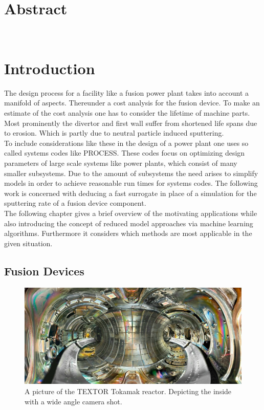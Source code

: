\chapter*{Abstract}
 ~\\
\chapter{Introduction}
	The design process for a facility like a fusion power plant takes into account a manifold of aspects. Thereunder a cost analysis for the fusion device. To make an estimate of the cost analysis one has to consider the lifetime of machine parts. Most prominently the divertor and first wall suffer from shortened life spans due to erosion. Which is partly due to neutral particle induced sputtering.\\
	To include considerations like these in the design of a power plant one uses so called systems codes like PROCESS\cite{process}. These codes focus on optimizing design parameters of large scale systems like power plants, which consist of many smaller subsystems. Due to the amount of subsystems the need arises to simplify models in order to achieve reasonable run times for systems codes. The following work is concerned with deducing a fast surrogate in place of a simulation for the sputtering rate of a fusion device component.\\
	The following chapter gives a brief overview of the motivating applications while also introducing the concept of reduced model approaches via machine learning algorithms. Furthermore it considers which methods are most applicable in the given situation.\\
	
	\section{Fusion Devices}
	
	\begin{figure}[ht]
	\includegraphics[width=\textwidth]{images/TEXTOR_tokamak_narrow.jpg}
	\caption{A picture of the TEXTOR Tokamak reactor. Depicting the inside with a wide angle camera shot.}
	\label{TEXTOR_JPG}
	\end{figure}
	
